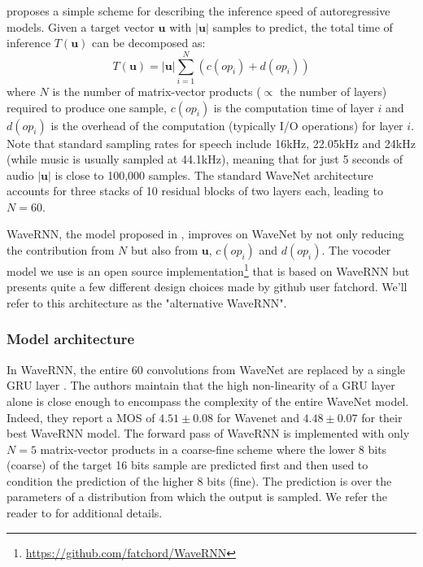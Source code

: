 \documentclass[a4paper, oneside, 12pt, english]{article}
\begin{document}
\citep{WaveRNN} proposes a simple scheme for describing the inference speed of autoregressive models. Given a target vector $\mathbf{u}$ with $|\mathbf{u}|$ samples to predict, the total time of inference $T(\mathbf{u})$ can be decomposed as:
$$ T(\mathbf{u}) = |\mathbf{u}|\sum_{i=1}^{N}(c(op_i) + d(op_i)) $$
where $N$ is the number of matrix-vector products ($\propto$ the number of layers) required to produce one sample, $c(op_i)$ is the computation time of layer $i$ and $d(op_i)$ is the overhead of the computation (typically I/O operations) for layer $i$. Note that standard sampling rates for speech include 16kHz, 22.05kHz and 24kHz (while music is usually sampled at 44.1kHz), meaning that for just 5 seconds of audio $|\mathbf{u}|$ is close to 100,000 samples. The standard WaveNet architecture accounts for three stacks of 10 residual blocks of two layers each, leading to $N = 60$. 

WaveRNN, the model proposed in \citep{WaveRNN}, improves on WaveNet by not only reducing the contribution from $N$ but also from $\mathbf{u}$, $c(op_i)$ and $d(op_i)$. The vocoder model we use is an open source implementation\footnote{\url{https://github.com/fatchord/WaveRNN}} that is based on WaveRNN but presents quite a few different design choices made by github user fatchord. We'll refer to this architecture as the "alternative WaveRNN".

\subsubsection{Model architecture}
In WaveRNN, the entire 60 convolutions from WaveNet are replaced by a single GRU layer \citep{GRU}. The authors maintain that the high non-linearity of a GRU layer alone is close enough to encompass the complexity of the entire WaveNet model. Indeed, they report a MOS of $4.51 \pm 0.08$ for Wavenet and $4.48 \pm 0.07$ for their best WaveRNN model. The forward pass of WaveRNN is implemented with only $N = 5$ matrix-vector products in a coarse-fine scheme where the lower 8 bits (coarse) of the target 16 bits sample are predicted first and then used to condition the prediction of the higher 8 bits (fine). The prediction is over the parameters of a distribution from which the output is sampled. We refer the reader to \citep{WaveRNN} for additional details.
\end{document}
